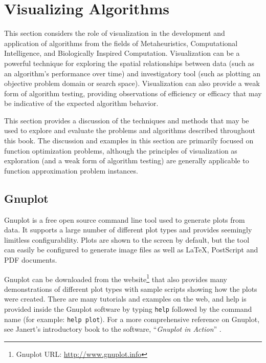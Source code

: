 
\section{Visualizing Algorithms} 
\label{advanced:sec:visualizing_algorithms}

This section considers the role of visualization in the development and application of algorithms from the fields of Metaheuristics, Computational Intelligence, and Biologically Inspired Computation.
Visualization can be a powerful technique for exploring the spatial relationships between data (such as an algorithm's performance over time) and investigatory tool (such as plotting an objective problem domain or search space). Visualization can also provide a weak form of algorithm testing, providing observations of efficiency or efficacy that may be indicative of the expected algorithm behavior.

This section provides a discussion of the techniques and methods that may be used to explore and evaluate the problems and algorithms described throughout this book. 
The discussion and examples in this section are primarily focused on function optimization problems, although the principles of visualization as exploration (and a weak form of algorithm testing) are generally applicable to function approximation problem instances.

%
%
\subsection{Gnuplot}
Gnuplot is a free open source command line tool used to generate plots from data. It supports a large number of different plot types and provides seemingly limitless configurability. Plots are shown to the screen by default, but the tool can easily be configured to generate image files as well as \LaTeX, PostScript and PDF documents.

Gnuplot can be downloaded from the website\footnote{Gnuplot URL: \url{http://www.gnuplot.info}} that also provides many demonstrations of different plot types with sample scripts showing how the plots were created. There are many tutorials and examples on the web, and help is provided inside the Gnuplot software by typing \texttt{help} followed by the command name (for example: \texttt{help plot}). For a more comprehensive reference on Gnuplot, see Janert's introductory book to the software, ``\emph{Gnuplot in Action}'' \cite{Janert2009}.

